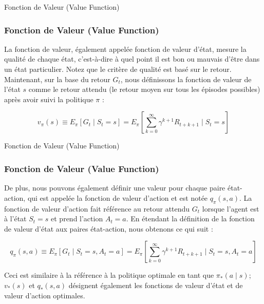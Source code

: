 \documentclass[serif, aspectratio=169]{beamer}
\begin{document}
\begin{frame}{Fonction de Valeur (Value Function)}
	\frametitle{Fonction de Valeur (Value Function)}
	
	La fonction de valeur, également appelée fonction de valeur d'état, mesure la qualité de chaque état, c'est-à-dire à quel point il est bon ou mauvais d'être dans un état particulier. Notez que le critère de qualité est basé sur le retour. Maintenant, sur la base du retour \( G_t \), nous définissons la fonction de valeur de l'état \( s \) comme le retour attendu (le retour moyen sur tous les épisodes possibles) après avoir suivi la politique \( \pi \) :
	
	\vspace{10pt}
	
	\[
	v_\pi(s) \equiv E_\pi[G_t \mid S_t = s] = E_\pi\left[\sum_{k=0}^{\infty} \gamma^{k+1} R_{t+k+1} \mid S_t = s\right]
	\]
	
\end{frame}


\begin{frame}{Fonction de Valeur (Value Function)}
	\frametitle{Fonction de Valeur (Value Function)}
	
	De plus, nous pouvons également définir une valeur pour chaque paire état-action, qui est appelée la fonction de valeur d'action et est notée \( q_\pi(s, a) \). La fonction de valeur d'action fait référence au retour attendu \( G_t \) lorsque l'agent est à l'état \( S_t = s \) et prend l'action \( A_t = a \). En étendant la définition de la fonction de valeur d'état aux paires état-action, nous obtenons ce qui suit :
	
	\[
	q_\pi(s, a) \equiv E_\pi[G_t \mid S_t = s, A_t = a] = E_\pi\left[\sum_{k=0}^{\infty} \gamma^{k+1} R_{t+k+1} \mid S_t = s, A_t = a\right]
	\]
	
	Ceci est similaire à la référence à la politique optimale en tant que \( \pi_*(a \mid s) \); \( v_*(s) \) et \( q_*(s, a) \) désignent également les fonctions de valeur d'état et de valeur d'action optimales.
	
\end{frame}
\end{document}
